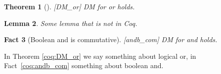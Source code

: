 \documentclass{article}
\theoremstyle{coqtheorem}
\newtheorem{theorem}{Theorem}
\newtheorem{lemma}[theorem]{Lemma}
\newtheorem{fact}[theorem]{Fact}
\begin{document}
\begin{theorem}[][DM_or]
  DM for or holds.
\end{theorem}

\begin{lemma}
  Some lemma that is not in Coq.
\end{lemma}

\begin{fact}[Boolean and is commutative][andb_com]
  DM for and holds.
\end{fact}

In Theorem \ref{coq:DM_or} we say something about logical or, in
Fact~\ref{coq:andb_com} something about boolean and.
\end{document}
